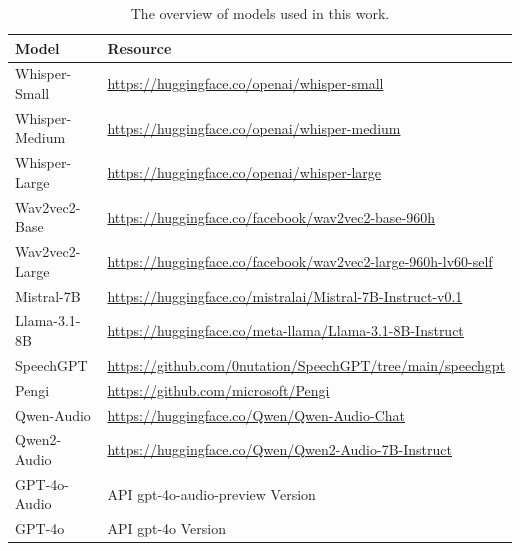 \documentclass[11pt]{article}
\begin{document}
\begin{table}[htbp]
\centering
\small
\begin{tabular}{ll} 
\toprule[1pt]
\textbf{Model} & \textbf{Resource} \\
\midrule
Whisper-Small & \url{https://huggingface.co/openai/whisper-small} \\
Whisper-Medium & \url{https://huggingface.co/openai/whisper-medium} \\
Whisper-Large & \url{https://huggingface.co/openai/whisper-large} \\
\midrule
Wav2vec2-Base & \url{https://huggingface.co/facebook/wav2vec2-base-960h} \\
Wav2vec2-Large & \url{https://huggingface.co/facebook/wav2vec2-large-960h-lv60-self} \\
\midrule
Mistral-7B & \url{https://huggingface.co/mistralai/Mistral-7B-Instruct-v0.1} \\
Llama-3.1-8B & \url{https://huggingface.co/meta-llama/Llama-3.1-8B-Instruct} \\
\midrule
SpeechGPT & \url{https://github.com/0nutation/SpeechGPT/tree/main/speechgpt} \\
Pengi & \url{https://github.com/microsoft/Pengi} \\
Qwen-Audio & \url{https://huggingface.co/Qwen/Qwen-Audio-Chat} \\
Qwen2-Audio & \url{https://huggingface.co/Qwen/Qwen2-Audio-7B-Instruct} \\
GPT-4o-Audio  & API gpt-4o-audio-preview Version \\
\midrule
GPT-4o & API gpt-4o Version \\
\bottomrule[1pt]
\end{tabular}
\caption{The overview of models used in this work.}
\label{tab:model_resources}
\end{table}
\end{document}

